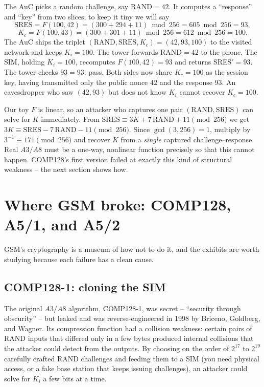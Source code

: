 The AuC picks a random challenge, say $\text{RAND} = 42$. It computes a ``response'' and ``key'' from two slices; to keep it tiny we will say
\[
  \text{SRES} = F(100, 42) = (300 + 294 + 11)\bmod 256 = 605 \bmod 256 = 93,
\]
\[
  K_c = F(100, 43) = (300 + 301 + 11)\bmod 256 = 612 \bmod 256 = 100 .
\]
The AuC ships the triplet $(\text{RAND}, \text{SRES}, K_c) = (42, 93, 100)$ to the visited network and keeps $K_i=100$. The tower forwards $\text{RAND}=42$ to the phone. The SIM, holding $K_i=100$, recomputes $F(100,42)=93$ and returns SRES$'=93$. The tower checks $93 = 93$: pass. Both sides now share $K_c = 100$ as the session key, having transmitted only the public nonce $42$ and the response $93$. An eavesdropper who saw $(42, 93)$ but does not know $K_i$ cannot recover $K_c = 100$.

\begin{trapbox}
Our toy $F$ is linear, so an attacker who captures one pair $(\text{RAND},\text{SRES})$ can solve for $K$ immediately. From $\text{SRES} \equiv 3K + 7\,\text{RAND} + 11 \pmod{256}$ we get $3K \equiv \text{SRES} - 7\,\text{RAND} - 11 \pmod{256}$. Since $\gcd(3,256)=1$, multiply by $3^{-1}\equiv 171 \pmod{256}$ and recover $K$ from a \emph{single} captured challenge--response. Real $A3/A8$ must be a one-way, nonlinear function precisely so that this cannot happen. COMP128's first version failed at exactly this kind of structural weakness -- the next section shows how.
\end{trapbox}

\section{Where GSM broke: COMP128, A5/1, and A5/2}
\label{ch29:gsm-breaks}

GSM's cryptography is a museum of how not to do it, and the exhibits are worth studying because each failure has a clean cause.

\subsection{COMP128-1: cloning the SIM}
\label{ch29:comp128}

The original $A3/A8$ algorithm, COMP128-1, was secret -- ``security through obscurity'' -- but leaked and was reverse-engineered in 1998 by Briceno, Goldberg, and Wagner. Its compression function had a collision weakness: certain pairs of RAND inputs that differed only in a few bytes produced internal collisions that the attacker could detect from the outputs. By choosing on the order of $2^{17}$ to $2^{19}$ carefully crafted RAND challenges and feeding them to a SIM (you need physical access, or a fake base station that keeps issuing challenges), an attacker could solve for $K_i$ a few bits at a time.

